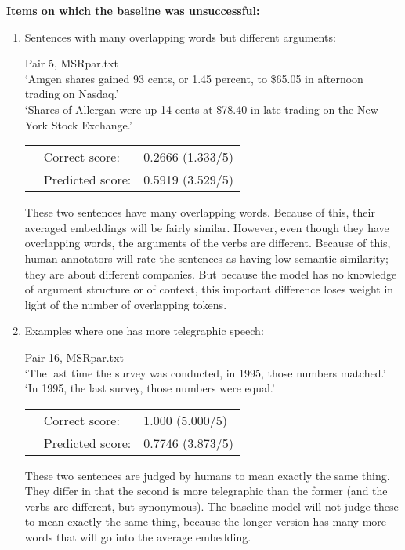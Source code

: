 \documentclass{article}
\begin{document}
\vspace{.5cm}
\noindent\textbf{Items on which the baseline was unsuccessful:}
\begin{enumerate}
	\item Sentences with many overlapping words but different arguments:
	
	Pair 5, MSRpar.txt\\
	`Amgen shares gained 93 cents, or 1.45 percent, to \$65.05 in afternoon trading on Nasdaq.'\\
	`Shares of Allergan were up 14 cents at \$78.40 in late trading on the New York Stock Exchange.'\\
		 \begin{tabular}{lll}
		&	Correct score: & 0.2666 (1.333/5)\\
		& Predicted score: & 0.5919 (3.529/5)\\
	\end{tabular}

	These two sentences have many overlapping words. Because of this, their averaged embeddings will be fairly similar. However, even though they have overlapping words, the arguments of the verbs are different. Because of this, human annotators will rate the sentences as having low semantic similarity; they are about different companies. But because the model has no knowledge of argument structure or of context, this important difference loses weight in light of the number of overlapping tokens.
	
	\item Examples where one has more telegraphic speech:
	
	Pair 16, MSRpar.txt\\
	`The last time the survey was conducted, in 1995, those numbers matched.'\\
	`In 1995, the last survey, those numbers were equal.'\\
	 \begin{tabular}{lll}
		&	Correct score: & 1.000 (5.000/5)\\
		& Predicted score: & 0.7746 (3.873/5)\\
	\end{tabular}
	
	These two sentences are judged by humans to mean exactly the same thing. They differ in that the second is more telegraphic than the former (and the verbs are different, but synonymous). The baseline model will not judge these to mean exactly the same thing, because the longer version has many more words that will go into the average embedding.
	

\end{enumerate}
\end{document}

